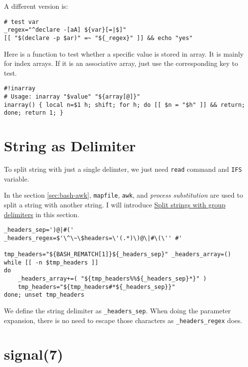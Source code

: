 A different version is:

\begin{lstlisting}
# test var
_regex="^declare -[aA] ${var}[=|$]"
[[ "$(declare -p $ar)" =~ "${_regex}" ]] && echo "yes"
\end{lstlisting}

Here is a function to test whether a specific value is stored in
array. It is mainly for index arrays. If it is an associative
array, just use the corresponding key to test.

\begin{lstlisting}
#!inarray
# Usage: inarray "$value" "${array[@]}"
inarray() { local n=$1 h; shift; for h; do [[ $n = "$h" ]] && return; done; return 1; }
\end{lstlisting}

\section{String as Delimiter}
\label{sec:bash-str-as-delim}

To split string with just a single delimter, we just need
\lstinline|read| command and \lstinline|IFS| variable.

In the section \ref{sec:bash-awk}, \lstinline|mapfile|,
\lstinline{awk}, and \textit{process substitution} are used to
split a string with another string. I will introduce
\href{https://www.tutorialkart.com/bash-shell-scripting/bash-split-string/#split-string-with-multiple-character-delimiter}{Split
  strings with group delimiters} in this section.

\begin{minipage}{1.0\linewidth}
\begin{lstlisting}
_headers_sep=')@|#('
_headers_regex=$'\^\~\$headers=\'(.*)\)@\|#\(\'' #'

tmp_headers="${BASH_REMATCH[1]}${_headers_sep}" _headers_array=()
while [[ -n $tmp_headers ]]
do
    _headers_array+=( "${tmp_headers%%${_headers_sep}*}" )
    tmp_headers="${tmp_headers#*${_headers_sep}}"
done; unset tmp_headers
\end{lstlisting}
\end{minipage}

We define the string delimiter as \lstinline|_headers_sep|. When
doing the parameter expansion, there is no need to escape those
characters as \lstinline|_headers_regex| does.

\section{signal(7)}
\label{sec:signal7}

